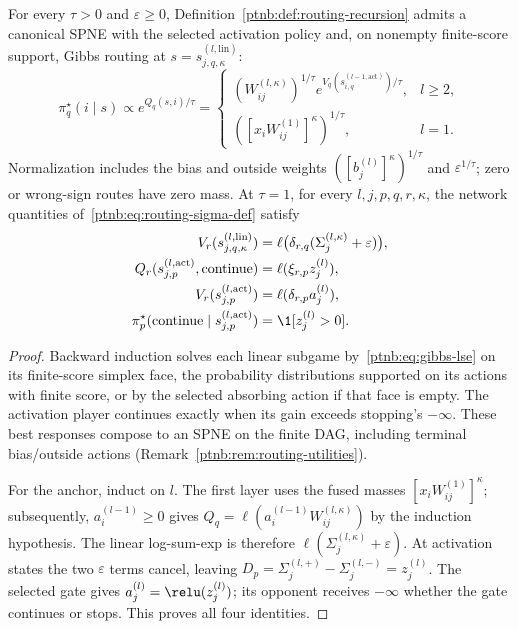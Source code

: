 \begin{theoremenv}\label{ptnb:thm:routing-forward}
For every $\tau>0$ and $\varepsilon\geq0$, Definition~\ref{ptnb:def:routing-recursion} admits a canonical SPNE with the selected activation policy and, on nonempty finite-score support, Gibbs routing at $s=s_{j,q,\kappa}^{(l,\mathrm{lin})}$:
\begin{equation}\label{ptnb:eq:routing-spne-linear}
 \pi_q^\star(i\mid s)\propto e^{Q_q(s,i)/\tau}
 =\begin{cases}
 (W_{ij}^{(l,\kappa)})^{1/\tau}e^{V_q(s_{i,q}^{(l-1,\mathrm{act})})/\tau},&l\geq2,\\
 ([x_iW_{ij}^{(1)}]^\kappa)^{1/\tau},&l=1.
 \end{cases}
\end{equation}
Normalization includes the bias and outside weights $([b_j^{(l)}]^\kappa)^{1/\tau}$ and $\varepsilon^{1/\tau}$; zero or wrong-sign routes have zero mass. At $\tau=1$, for every $l,j,p,q,r,\kappa$, the network quantities of~\eqref{ptnb:eq:routing-sigma-def} satisfy
\begin{align}
 V_r(s_{j,q,\kappa}^{(l,\mathrm{lin})})&=\ell\bigl(\delta_{r,q}(\Sigma_j^{(l,\kappa)}+\varepsilon)\bigr),\label{ptnb:eq:routing-forward-linear}\\
 Q_r(s_{j,p}^{(l,\mathrm{act})},\mathrm{continue})&=\ell(\xi_{r,p}z_j^{(l)}),\label{ptnb:eq:routing-forward-continue}\\
 V_r(s_{j,p}^{(l,\mathrm{act})})&=\ell(\delta_{r,p}a_j^{(l)}),\label{ptnb:eq:routing-forward-act}\\
 \pi_p^\star(\mathrm{continue}\mid s_{j,p}^{(l,\mathrm{act})})&=\1[z_j^{(l)}>0].\label{ptnb:eq:routing-forward-stop}
\end{align}
\end{theoremenv}
\begin{proof}
Backward induction solves each linear subgame by~\eqref{ptnb:eq:gibbs-lse} on its finite-score simplex face, the probability distributions supported on its actions with finite score, or by the selected absorbing action if that face is empty. The activation player continues exactly when its gain exceeds stopping's $-\infty$. These best responses compose to an SPNE on the finite DAG, including terminal bias/outside actions (Remark~\ref{ptnb:rem:routing-utilities}).

For the anchor, induct on $l$. The first layer uses the fused masses $[x_iW_{ij}^{(1)}]^\kappa$; subsequently, $a_i^{(l-1)}\geq0$ gives $Q_q=\ell(a_i^{(l-1)}W_{ij}^{(l,\kappa)})$ by the induction hypothesis. The linear log-sum-exp is therefore $\ell(\Sigma_j^{(l,\kappa)}+\varepsilon)$. At activation states the two $\varepsilon$ terms cancel, leaving $D_p=\Sigma_j^{(l,+)}-\Sigma_j^{(l,-)}=z_j^{(l)}$. The selected gate gives $a_j^{(l)}=\relu(z_j^{(l)})$; its opponent receives $-\infty$ whether the gate continues or stops. This proves all four identities.
\end{proof}

